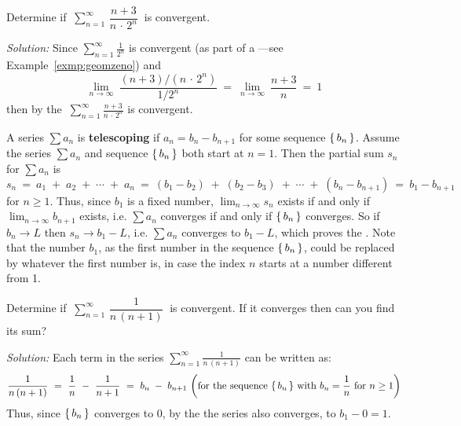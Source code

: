 {\begin{exmp}
\noindent Determine if
$~\displaystyle\sum_{n=1}^{\infty} \,\dfrac{n+3}{n \,\cdot\, 2^n}~$ is
convergent.\vspace{1mm}
\par\noindent\emph{Solution:} Since $\sum_{n=1}^{\infty} \frac{1}{2^n}$ is
convergent (as part of a ---see Example~\ref{exmp:geomzeno}) and
\[
\lim_{n \to \infty} ~\frac{(n+3)/(n \,\cdot\, 2^n)}{1/2^n} ~=~
\lim_{n \to \infty} ~\frac{n+3}{n} ~=~ 1
\]
then by the 
$~\sum_{n=1}^{\infty} \frac{n+3}{n \,\cdot\, 2^n}$ is convergent.
\end{exmp}
\divider
{}

A series $\sum a_n$ is \textbf{telescoping} if
$a_n = b_n - b_{n+1}$ for some sequence $\left\lbrace\mspace{3mu}b_n\mspace{3mu}\right\rbrace$.
Assume the series $\sum a_n$ and sequence $\left\lbrace\mspace{3mu}b_n\mspace{3mu}\right\rbrace$ both start at $n=1$. Then
the partial sum $s_n$ for $\sum a_n$ is
\[
s_n ~=~ a_1 \;+\; a_2 \;+\; \cdots \;+\; a_n ~=~
(b_1 - b_2) \;+\; (b_2 - b_3) \;+\; \cdots \;+\; (b_n - b_{n+1}) ~=~
b_1 - b_{n+1}
\]
for $n \ge 1$. Thus, since $b_1$ is a fixed number, $\lim_{n \to \infty} s_n$
exists if and only if $\lim_{n \to \infty} b_{n+1}$ exists, i.e. $\sum a_n$
converges if and only if $\left\lbrace\mspace{3mu}b_n\mspace{3mu}\right\rbrace$ converges. So if $b_n \rightarrow L$ then
$s_n \rightarrow b_1 - L$, i.e. $\sum a_n$ converges to $b_1 - L$, which proves the
. Note that the number $b_1$, as the first number in the
sequence $\left\lbrace\mspace{3mu}b_n\mspace{3mu}\right\rbrace$, could be replaced by whatever the first number is, in case
the index $n$ starts at a number different from 1.

\begin{exmp}\label{exmp:telescoping}
\noindent Determine if
$~\displaystyle\sum_{n=1}^{\infty} \,\dfrac{1}{n\,(n+1)}~$ is
convergent. If it converges then can you find its sum?\vspace{1mm}
\par\noindent\emph{Solution:} Each term in the series $\sum_{n=1}^{\infty} \frac{1}{n\,(n+1)}$ can be written as:
\[
\frac{1}{n\,(n+1)} ~=~ \frac{1}{n} ~-~ \frac{1}{n+1} ~=~ b_n \;-\; b_{n+1}\,\left(\text{for the sequence $\left\lbrace\mspace{3mu}b_n\mspace{3mu}\right\rbrace$ with
$b_n = \frac{1}{n}$ for $n \ge 1$}\right)
\]
Thus, since $\left\lbrace\mspace{3mu}b_n\mspace{3mu}\right\rbrace$ converges to 0, by the  the
series also converges, to $b_1 - 0 = 1$.
\end{exmp}\vspace{-1mm}
\divider
\vspace{2mm}

}
